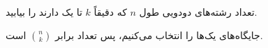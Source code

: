 \begin{question}
تعداد رشته‌های دودویی طول $n$ که دقیقاً $k$ تا یک دارند را بیابید.

\begin{solution}
جایگاه‌های یک‌ها را انتخاب می‌کنیم، پس تعداد برابر $\binom{n}{k}$ است.
\end{solution}
\end{question}
